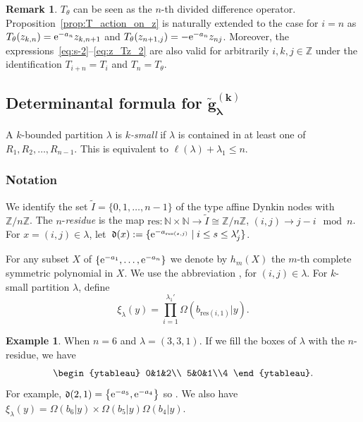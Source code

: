 \documentclass[pdftex]{sigma}
\numberwithin{equation}{section}
\newcommand{\co}{\xi}
\newcommand{\Iaf}{\tilde{I}}
\newcommand{\la}{\lambda}
\newcommand{\Z}{\mathbb{Z}}
\newcommand{\ha}{f}
\def\ZZ{\mathord{\mathbb{Z}}}
\theoremstyle{definition}
\newtheorem{Example}[Theorem]{Example}
\newtheorem{Remark}[Theorem]{Remark}
\begin{document}
\begin{Remark}
$T_\theta$ can be seen as the $n$-th divided difference operator.
Proposition~\ref{prop:T_action_on_z} is naturally extended to
the case for $i=n$ as
$
T_\theta(z_{k,n})={\rm e}^{-a_n}z_{k,n+1}$ and $ T_\theta(z_{n+1,j})=-{\rm e}^{-a_n}z_{nj}$.
Moreover, the expressions~\eqref{eq:s-2}--\eqref{eq:z_Tz_2} are also valid for arbitrarily $i,k,j\in \ZZ$ under the identification $T_{i+n}=T_i$ and $T_n=T_\theta$.
\end{Remark}

\subsection[Determinantal formula for g\^{}(k)\_lambda]{Determinantal formula for $\boldsymbol{\tilde{g}^{(k)}_\lambda}$}
\label{sec:det_formula}
A $k$-bounded partition $\lambda$ is \textit{$k$-small} if $\lambda$ is contained in at least one of $R_1,R_2,\dots,R_{n-1}$.
This is equivalent to $\ell(\la)+\la_1\le n$.

\subsubsection{Notation}
We identify the set $\Iaf=\{0,1,\dots,n-1\}$ of
the type  affine Dynkin nodes
with $\Z/n\Z$.
The $n$-\emph{residue} is the map
$
\mathrm{res}\colon
\mathbb{N}\times \mathbb{N}
\rightarrow \Iaf\cong \Z/n\Z$, $
(i,j)\to j-i \mod n$.
For $x=(i,j)\in \la$, let~${
\mathfrak{d}(x):=\{{\rm e}^{-a_{\mathrm{res}(s,j)}}\mid i\le s\le \la_j'\}}$.


For any subset $X$ of $\{{\rm e}^{-a_1},\dots,{\rm e}^{-a_n}\}$
we denote by $h_m(X)$ the $m$-th complete symmetric
polynomial in $X$.
We use
the abbreviation
\smash{$
\ha_m^{\langle i,j\rangle;\la}:=h_m(\mathfrak{d}(i,j))$},
for $(i,j)\in \la$.
For $k$-small partition $\la$, define
\begin{equation}
\label{eq:def xi}
\co_\la(y)=\prod_{i=1}^{\la_1'}\Omega(b_{\mathrm{res}(i,1)}|y).
\end{equation}




\begin{Example}\label{ex:h d}
When $n=6$ and
$
\lambda=(3,3,1)$.
If we fill the boxes of $\la$ with the $n$-residue, we have
\[
\begin{ytableau}
0&1&2\\
5&0&1\\4
\end{ytableau}.
\]
For example, $\mathfrak{d}(2,1)=\big\{{\rm e}^{-a_5},{\rm e}^{-a_4}\big\}$ so
\smash{$\ha_m^{\langle 2,1\rangle;\la}=h_m({\rm e}^{-a_5},{\rm e}^{-a_4})$}.
We also have
$
\co_\la(y)=\Omega(b_6|y)\allowbreak\times\Omega(b_5|y)\Omega(b_4|y)$.
\end{Example}
\end{document}
